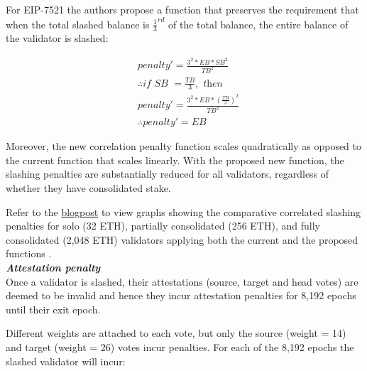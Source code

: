 For EIP-7521 the authors propose a function that preserves the requirement that when the total slashed balance is $\frac{1}{3}^{rd}$ of the total balance, the entire balance of the validator is slashed:

\begin{equation*}
\begin{split}
& penalty' = \frac{3^2 * EB * SB^2}{TB^2} \\
& \therefore \textit{if SB } = \frac{TB}{3}, \textit{ then} \\
& penalty' =   \frac{3^2 * EB * \left(  \frac{TB}{3} \right)^2 }{TB^2} \\
& \therefore penalty' = EB
\end{split}
\end{equation*}

Moreover, the new correlation penalty function scales quadratically as opposed to the current function that scales linearly. With the proposed new function, the slashing penalties are substantially reduced for all validators, regardless of whether they have consolidated stake.

Refer to the \href{https://notes.ethereum.org/@mikeneuder/slashings-eip-7251}{blogpost} to view graphs showing the comparative correlated slashing penalties for solo (32 ETH), partially consolidated (256 ETH), and fully consolidated (2,048 ETH) validators applying both the current and the proposed functions \cite{Neuder2023d}. \\

\noindent
\textbf{\textit{Attestation penalty}} \\
Once a validator is slashed, their attestations (source, target and head votes) are deemed to be invalid and hence they incur attestation penalties for 8,192 epochs until their exit epoch. 

Different weights are attached to each vote, but only the source (weight = 14) and target (weight = 26) votes incur penalties. For each of the 8,192 epochs the slashed validator will incur:

